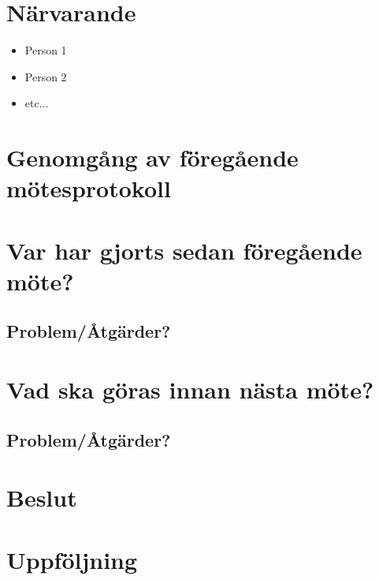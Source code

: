 
\section*{Närvarande}
\begin{itemize}[noitemsep]
    \item Person 1
    \item Person 2
    \item etc...
\end{itemize}

\section*{Genomgång av föregående mötesprotokoll}


\section*{Var har gjorts sedan föregående möte?}

\subsection*{Problem/Åtgärder?}


\section*{Vad ska göras innan nästa möte?}

\subsection*{Problem/Åtgärder?}


\section*{Beslut}

\section*{Uppföljning}
